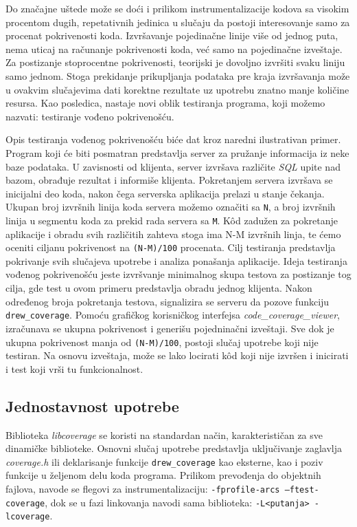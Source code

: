\documentclass[12pt,oneside]{memoir}
\newcommand{\kod}[1]{\texttt{#1}}
\newcommand{\strano}[1]{\textit{#1}}
\begin{document}
Do značajne uštede može se doći i prilikom instrumentalizacije kodova sa visokim procentom dugih, repetativnih jedinica u slučaju da postoji interesovanje samo za procenat pokrivenosti koda. Izvršavanje pojedinačne linije više od jednog puta, nema uticaj na računanje pokrivenosti koda, već samo na pojedinačne izveštaje. Za postizanje stoprocentne pokrivenosti, teorijski je dovoljno izvršiti svaku liniju samo jednom. Stoga prekidanje prikupljanja podataka pre kraja izvršavanja može u ovakvim slučajevima dati korektne rezultate uz upotrebu znatno manje količine resursa. Kao posledica, nastaje novi oblik testiranja programa, koji možemo nazvati: testiranje vođeno pokrivenošću. 

Opis testiranja vođenog pokrivenošću biće dat kroz naredni ilustrativan primer. Program koji će biti posmatran predstavlja server za pružanje informacija iz neke baze podataka. U zavisnosti od klijenta, server izvršava različite \strano{SQL} upite nad bazom, obrađuje rezultat i informiše klijenta. Pokretanjem servera izvršava se inicijalni deo koda, nakon čega serverska aplikacija prelazi u stanje čekanja. Ukupan broj izvršnih linija koda servera možemo označiti sa \kod{N}, a broj izvršnih linija u segmentu koda za prekid rada servera sa \kod{M}. K\^{o}d zadužen za pokretanje aplikacije i obradu svih različitih zahteva stoga ima N-M izvršnih linja, te ćemo oceniti ciljanu pokrivenost na \kod{(N-M)/100} procenata. Cilj testiranja predstavlja pokrivanje svih slučajeva upotrebe i analiza ponašanja aplikacije. Ideja testiranja vođenog pokrivenošću jeste izvršvanje minimalnog skupa testova za postizanje tog cilja, gde test u ovom primeru predstavlja obradu jednog klijenta. Nakon određenog broja pokretanja testova, signalizira se serveru da pozove funkciju \kod{drew\_coverage}. Pomoću grafičkog korisničkog interfejsa \strano{code\_coverage\_viewer}, izračunava se ukupna pokrivenost i generišu pojedninačni izveštaji. Sve dok je ukupna pokrivenost manja od \kod{(N-M)/100}, postoji slučaj upotrebe koji nije testiran. Na osnovu izveštaja, može se lako locirati k\^{o}d koji nije izvršen i inicirati i test koji vrši tu funkcionalnost.

\subsection{Jednostavnost upotrebe}

Biblioteka \strano{libcoverage} se koristi na standardan način, karakterističan za sve dinamičke biblioteke. Osnovni slučaj upotrebe predstavlja uključivanje zaglavlja \strano{coverage.h} ili deklarisanje funkcije \kod{drew\_coverage} kao eksterne, kao i poziv funkcije u željenom delu koda programa. Prilikom prevođenja do objektnih fajlova, navode se flegovi za instrumentalizaciju: \kod{-fprofile-arcs –ftest-coverage}, dok se u fazi linkovanja navodi sama biblioteka: \kod{-L<putanja> -lcoverage}.
\end{document}

